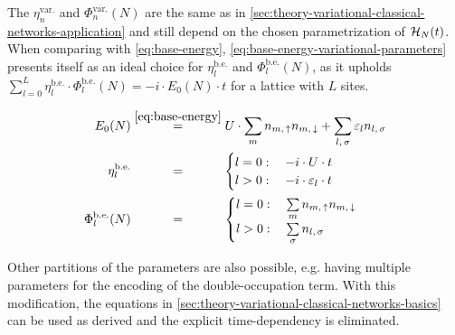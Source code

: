 The $\eta^\text{var.}_{n}$ and $\Phi^\text{var.}_{n}(N)$ are the same as in \autoref{sec:theory-variational-classical-networks-application} and still depend on the chosen parametrization of $\mathcal{H}_{N}(t)$.
When comparing with \autoref{eq:base-energy}, \autoref{eq:base-energy-variational-parameters} presents itself as an ideal choice for $\eta^\text{b.e.}_{l}$ and $\Phi^\text{b.e.}_{l}(N)$, as it upholds $\sum\limits_{l=0}^{L} \eta^\text{b.e.}_{l} \cdot \Phi^\text{b.e.}_{l}(N) = -i \cdot E_0(N) \cdot t$ for a lattice with $L$ sites.

\begin{equation}
    \label{eq:base-energy-variational-parameters}
    \begin{split}
        E_0(N) &\stackrel{\ref{eq:base-energy}}{=} U \cdot \lsum[m] n_{m,\,\up}n_{m,\,\down} + \lsum[l,\,\sigma] \epsl n_{l,\,\sigma}\\
        \eta^\text{b.e.}_{l} &\stackrel{\phantom{\ref{eq:base-energy}}}{=} \begin{cases}
            l=0: \quad -i\cdot U \cdot t             \\
            l>0: \quad -i\cdot \epsl[l] \cdot t
        \end{cases}\\
        \Phi^\text{b.e.}_{l}(N) &\stackrel{\phantom{\ref{eq:base-energy}}}{=} \begin{cases}
            l=0: \quad \lsum[m] n_{m,\,\up}n_{m,\,\down}             \\
            l>0: \quad \lsum[\sigma] n_{l,\,\sigma}
        \end{cases}
    \end{split}
\end{equation}

Other partitions of the parameters are also possible, e.g. having multiple parameters for the encoding of the double-occupation term.
With this modification, the equations in \autoref{sec:theory-variational-classical-networks-basics} can be used as derived and the explicit time-dependency is eliminated.